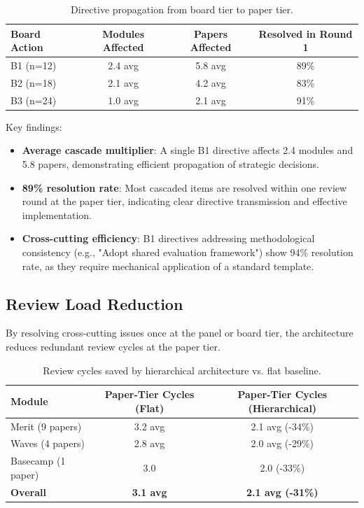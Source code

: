 \begin{table}[t]
\centering
\caption{Directive propagation from board tier to paper tier.}
\label{tab:propagation}
\begin{tabular}{lccc}
\toprule
Board Action & Modules Affected & Papers Affected & Resolved in Round 1 \\
\midrule
B1 (n=12) & 2.4 avg & 5.8 avg & 89\% \\
B2 (n=18) & 2.1 avg & 4.2 avg & 83\% \\
B3 (n=24) & 1.0 avg & 2.1 avg & 91\% \\
\bottomrule
\end{tabular}
\end{table}

Key findings:
\begin{itemize}
\item \textbf{Average cascade multiplier}: A single B1 directive affects 2.4 modules and 5.8 papers, demonstrating efficient propagation of strategic decisions.

\item \textbf{89\% resolution rate}: Most cascaded items are resolved within one review round at the paper tier, indicating clear directive transmission and effective implementation.

\item \textbf{Cross-cutting efficiency}: B1 directives addressing methodological consistency (e.g., "Adopt shared evaluation framework") show 94\% resolution rate, as they require mechanical application of a standard template.
\end{itemize}

\subsection{Review Load Reduction}

By resolving cross-cutting issues once at the panel or board tier, the architecture reduces redundant review cycles at the paper tier.

\begin{table}[t]
\centering
\caption{Review cycles saved by hierarchical architecture vs. flat baseline.}
\label{tab:load}
\begin{tabular}{lcc}
\toprule
Module & Paper-Tier Cycles (Flat) & Paper-Tier Cycles (Hierarchical) \\
\midrule
Merit (9 papers) & 3.2 avg & 2.1 avg (-34\%) \\
Waves (4 papers) & 2.8 avg & 2.0 avg (-29\%) \\
Basecamp (1 paper) & 3.0 & 2.0 (-33\%) \\
\midrule
\textbf{Overall} & \textbf{3.1 avg} & \textbf{2.1 avg (-31\%)} \\
\bottomrule
\end{tabular}
\end{table}

